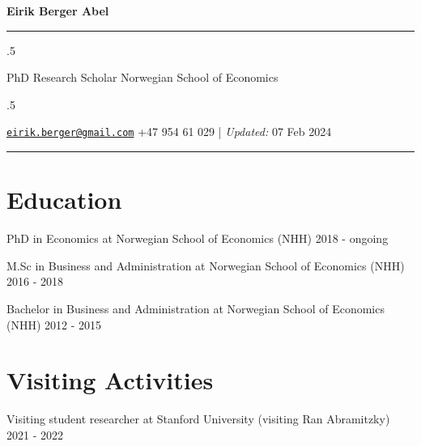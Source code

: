 \documentclass[11pt,]{article}
\begin{document}
\centerline{\huge \bf Eirik Berger Abel}

\vspace{2 mm}

\hrule

\vspace{2 mm}

\moveleft.5\hoffset\centerline{PhD Research Scholar \textbar{} Norwegian
School of Economics}

\moveleft.5\hoffset\centerline{ \faEnvelopeO \hspace{1 mm} \href{mailto:}{\tt \href{mailto:eirik.berger@gmail.com}{\nolinkurl{eirik.berger@gmail.com}}} \hspace{1 mm}  \faPhone \hspace{1 mm}  +47
954 61 029  \hspace{1 mm}         | \emph{Updated:} 07 Feb 2024}



\vspace{2 mm}

\hrule



\hypertarget{education}{%
\section{Education}\label{education}}

PhD in Economics at Norwegian School of Economics (NHH) \hfill 2018 -
ongoing\vspace{-0.2cm}

M.Sc in Business and Administration at Norwegian School of Economics
(NHH) \hfill 2016 - 2018\vspace{-0.2cm}

Bachelor in Business and Administration at Norwegian School of Economics
(NHH) \hfill 2012 - 2015\vspace{-0.2cm}

\vspace{0.5cm}

\hypertarget{visiting-activities}{%
\section{Visiting Activities}\label{visiting-activities}}

Visiting student researcher at Stanford University (visiting Ran
Abramitzky) \hfill 2021 - 2022\vspace{-0.2cm}

\vspace{0.5cm}
\end{document}
